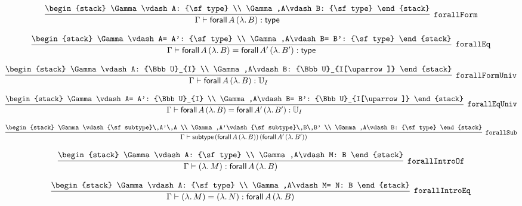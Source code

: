 
\[
\infer[{\tt forallForm}]{\Gamma \vdash {\sf forall}\,A\,(\lambda .\,B): {\sf type}}{
\begin{stack}
\Gamma \vdash A: {\sf type}
\\
\Gamma ,A\vdash B: {\sf type}
\end{stack}}
\]

\[
\infer[{\tt forallEq}]{\Gamma \vdash {\sf forall}\,A\,(\lambda .\,B)= {\sf forall}\,A'\,(\lambda .\,B'): {\sf type}}{
\begin{stack}
\Gamma \vdash A= A': {\sf type}
\\
\Gamma ,A\vdash B= B': {\sf type}
\end{stack}}
\]

\[
\infer[{\tt forallFormUniv}]{\Gamma \vdash {\sf forall}\,A\,(\lambda .\,B): {\Bbb U}_{I}}{
\begin{stack}
\Gamma \vdash A: {\Bbb U}_{I}
\\
\Gamma ,A\vdash B: {\Bbb U}_{I[\uparrow ]}
\end{stack}}
\]

\[
\infer[{\tt forallEqUniv}]{\Gamma \vdash {\sf forall}\,A\,(\lambda .\,B)= {\sf forall}\,A'\,(\lambda .\,B'): {\Bbb U}_{I}}{
\begin{stack}
\Gamma \vdash A= A': {\Bbb U}_{I}
\\
\Gamma ,A\vdash B= B': {\Bbb U}_{I[\uparrow ]}
\end{stack}}
\]

\[
\infer[{\tt forallSub}]{\Gamma \vdash {\sf subtype}\,({\sf forall}\,A\,(\lambda .\,B))\,({\sf forall}\,A'\,(\lambda .\,B'))}{
\begin{stack}
\Gamma \vdash {\sf subtype}\,A'\,A
\\
\Gamma ,A'\vdash {\sf subtype}\,B\,B'
\\
\Gamma ,A\vdash B: {\sf type}
\end{stack}}
\]

\[
\infer[{\tt forallIntroOf}]{\Gamma \vdash (\lambda .\,M): {\sf forall}\,A\,(\lambda .\,B)}{
\begin{stack}
\Gamma \vdash A: {\sf type}
\\
\Gamma ,A\vdash M: B
\end{stack}}
\]

\[
\infer[{\tt forallIntroEq}]{\Gamma \vdash (\lambda .\,M)= (\lambda .\,N): {\sf forall}\,A\,(\lambda .\,B)}{
\begin{stack}
\Gamma \vdash A: {\sf type}
\\
\Gamma ,A\vdash M= N: B
\end{stack}}
\]

